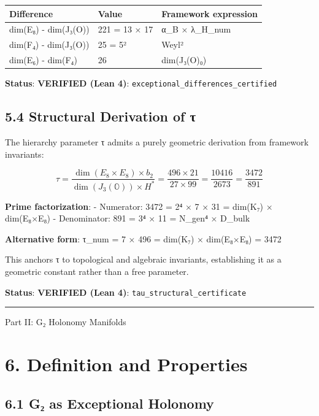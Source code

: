\documentclass[11pt,a4paper]{article}
\begin{document}
\begin{longtable}[]{@{}lll@{}}
\toprule\noalign{}
Difference & Value & Framework expression \\
\midrule\noalign{}
\endhead
\bottomrule\noalign{}
\endlastfoot
dim(E₈) - dim(J₃(O)) & 221 = 13 × 17 & α\_\allowbreak{}B × λ\_\allowbreak{}H\_\allowbreak{}num \\
dim(F₄) - dim(J₃(O)) & 25 = 5² & Weyl² \\
dim(E₆) - dim(F₄) & 26 & dim(J₃(O)₀) \\
\end{longtable}

\textbf{Status}: \textbf{VERIFIED (Lean 4)}: \texttt{exceptional\_\allowbreak{}differences\_\allowbreak{}certified}

\subsection{5.4 Structural Derivation of τ}\label{structural-derivation-of-ux3c4}

The hierarchy parameter τ admits a purely geometric derivation from framework invariants:

\[\tau = \frac{\dim(E_8 \times E_8) \times b_2}{\dim(J_3(\mathbb{O})) \times H^*} = \frac{496 \times 21}{27 \times 99} = \frac{10416}{2673} = \frac{3472}{891}\]

\textbf{Prime factorization}: - Numerator: 3472 = 2⁴ × 7 × 31 = dim(K₇) × dim(E₈×E₈) - Denominator: 891 = 3⁴ × 11 = N\_\allowbreak{}gen⁴ × D\_\allowbreak{}bulk

\textbf{Alternative form}: τ\_\allowbreak{}num = 7 × 496 = dim(K₇) × dim(E₈×E₈) = 3472

This anchors τ to topological and algebraic invariants, establishing it as a geometric constant rather than a free parameter.

\textbf{Status}: \textbf{VERIFIED (Lean 4)}: \texttt{tau\_\allowbreak{}structural\_\allowbreak{}certificate}

\begin{center}\rule{\linewidth}{0.5pt}\end{center}

Part II: G₂ Holonomy Manifolds

\section{6. Definition and Properties}\label{definition-and-properties}

\subsection{6.1 G₂ as Exceptional Holonomy}\label{gux2082-as-exceptional-holonomy}
\end{document}
